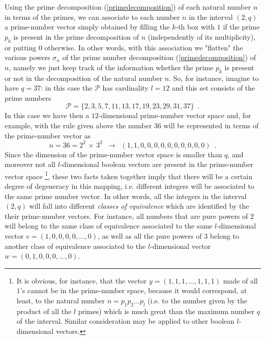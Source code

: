 \documentclass[aps,pra,superscriptaddress]{revtex4}
\renewcommand{\(}{\left(}
\renewcommand{\)}{\right)}
\renewcommand{\[}{\left[}
\renewcommand{\]}{\right]}
\begin{document}
Using the prime decomposition (\ref{primedecomposition}) of each natural number $n$ in terms of the primes, we can associate to each number $n$ in the interval $ (2,q)$ a prime-number vector simply obtained by filling the $k$-th box with $1$ if the prime $p_k$ is present in the prime decomposition of $n$ (independently of its multiplicity), or putting $0$ otherwise. In other words, with this association we "flatten" the various powers $\sigma_n$ of the prime number decomposition (\ref{primedecomposition}) of $n$, namely we just keep track of the information whether the prime $p_k$ is present or not in the decomposition of the natural number $n$. So, for instance, imagine to have $q = 37$: in this case the ${\mathcal P}$ has cardinality $l = 12$ and this set consists of the prime numbers 
$$
{\mathcal P} = \{2, 3, 5, 7, 11, 13, 17, 19, 23, 29, 31, 37\} \,\,\,.
$$
In this case we have then a $12$-dimensional prime-number vector space and, for example, with the rule given above the number $36$ will be represented in terms of the prime-number vector as 
$$ 
n = 36 = 2^2 \,\times\, 3^2 \,\,\,\longrightarrow \,\,\,(1,1,0,0,0,0,0,0,0,0,0,0) \,\,\,.
$$
Since the dimension of the prime-number vector space is smaller than $q$, and moreover not all $l$-dimensional boolean vectors are present in 
the prime-number vector space \footnote{It is obvious, for instance, that the vector $y = (1,1,1,\ldots, 1,1,1)$ made of all $1$'s cannot 
be in the prime-number space, because it would correspond, at least, to the natural number $n = p_1 p_2 \ldots p_l$ (i.e. to the number given by the 
product of all the $l$ primes) which is much great than the maximum number $q$ of the interval. Similar consideration may be applied to other 
boolean $l$-dimensional vectors.}, these two facts taken together imply that there will be a certain degree of degeneracy in this mapping, i.e. different integers will be associated to the same prime number vector. In other words, all the integers in the interval $(2,q)$ will fall into different {\em classes of equivalence} which are identified by the their prime-number vectors. For instance, all numbers that are pure powers of $2$ will belong to the same class of equivalence associated to the same $l$-dimensional vector $v = (1,0,0,0,0,\ldots, 0)$, as well as all the pure powers of $3$ belong to another class of equivalence associated to the $l$-dimensional vector $w = (0,1,0,0,0,\ldots,0)$.   
\end{document}
